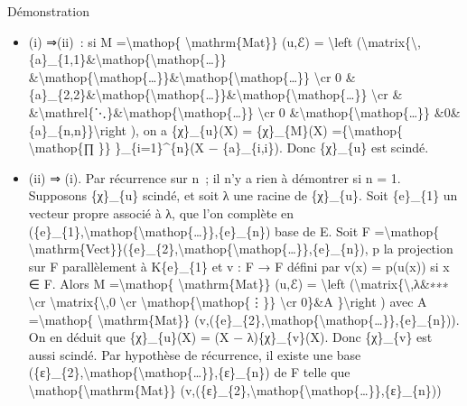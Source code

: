 \documentclass[]{article}
\begin{document}
Démonstration

\begin{itemize}
\itemsep1pt\parskip0pt
\item
  (i) ⇒(ii)~: si M =\textbackslash{}mathop\{
  \textbackslash{}mathrm\{Mat\}\} (u,ℰ) = \textbackslash{}left
  (\textbackslash{}matrix\{\textbackslash{},\{a\}\_\{1,1\}\&\textbackslash{}mathop\{\textbackslash{}mathop\{\ldots{}\}\}
  \&\textbackslash{}mathop\{\textbackslash{}mathop\{\ldots{}\}\}\&\textbackslash{}mathop\{\textbackslash{}mathop\{\ldots{}\}\}
  \textbackslash{}cr 0
  \&\{a\}\_\{2,2\}\&\textbackslash{}mathop\{\textbackslash{}mathop\{\ldots{}\}\}\&\textbackslash{}mathop\{\textbackslash{}mathop\{\ldots{}\}\}
  \textbackslash{}cr \&
  \&\textbackslash{}mathrel\{⋱\}\&\textbackslash{}mathop\{\textbackslash{}mathop\{\ldots{}\}\}
  \textbackslash{}cr 0
  \&\textbackslash{}mathop\{\textbackslash{}mathop\{\ldots{}\}\}
  \&0\&\{a\}\_\{n,n\}\}\textbackslash{}right ), on a \{χ\}\_\{u\}(X) =
  \{χ\}\_\{M\}(X) =\{\textbackslash{}mathop\{ \textbackslash{}mathop\{∏
  \}\} \}\_\{i=1\}\^{}\{n\}(X − \{a\}\_\{i,i\}). Donc \{χ\}\_\{u\} est
  scindé.
\item
  (ii) ⇒ (i). Par récurrence sur n~; il n'y a rien à démontrer si n = 1.
  Supposons \{χ\}\_\{u\} scindé, et soit λ une racine de \{χ\}\_\{u\}.
  Soit \{e\}\_\{1\} un vecteur propre associé à λ, que l'on complète en
  (\{e\}\_\{1\},\textbackslash{}mathop\{\textbackslash{}mathop\{\ldots{}\}\},\{e\}\_\{n\})
  base de E. Soit F =\textbackslash{}mathop\{
  \textbackslash{}mathrm\{Vect\}\}(\{e\}\_\{2\},\textbackslash{}mathop\{\textbackslash{}mathop\{\ldots{}\}\},\{e\}\_\{n\}),
  p la projection sur F parallèlement à K\{e\}\_\{1\} et v : F → F
  défini par v(x) = p(u(x)) si x ∈ F. Alors M =\textbackslash{}mathop\{
  \textbackslash{}mathrm\{Mat\}\} (u,ℰ) = \textbackslash{}left
  (\textbackslash{}matrix\{\textbackslash{},λ\&∗∗∗ \textbackslash{}cr
  \textbackslash{}matrix\{\textbackslash{},0 \textbackslash{}cr
  \textbackslash{}mathop\{\textbackslash{}mathop\{⋮\}\}
  \textbackslash{}cr 0\}\&A \}\textbackslash{}right ) avec A
  =\textbackslash{}mathop\{ \textbackslash{}mathrm\{Mat\}\}
  (v,(\{e\}\_\{2\},\textbackslash{}mathop\{\textbackslash{}mathop\{\ldots{}\}\},\{e\}\_\{n\})).
  On en déduit que \{χ\}\_\{u\}(X) = (X − λ)\{χ\}\_\{v\}(X). Donc
  \{χ\}\_\{v\} est aussi scindé. Par hypothèse de récurrence, il existe
  une base
  (\{ε\}\_\{2\},\textbackslash{}mathop\{\textbackslash{}mathop\{\ldots{}\}\},\{ε\}\_\{n\})
  de F telle que \textbackslash{}mathop\{\textbackslash{}mathrm\{Mat\}\}
  (v,(\{ε\}\_\{2\},\textbackslash{}mathop\{\textbackslash{}mathop\{\ldots{}\}\},\{ε\}\_\{n\}))

\end{itemize}
\end{document}

